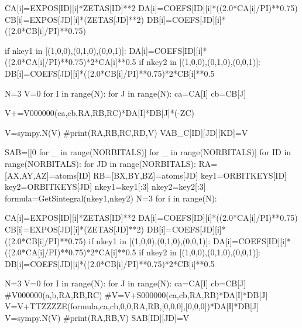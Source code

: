                         CA[i]=EXPOS[ID][i]*ZETAS[ID]**2
                        DA[i]=COEFS[ID][i]*((2.0*CA[i]/PI)**0.75)
                        CB[i]=EXPOS[JD][i]*(ZETAS[JD]**2)
                        DB[i]=COEFS[JD][i]*((2.0*CB[i]/PI)**0.75)

                        if nkey1 in [(1,0,0),(0,1,0),(0,0,1)]:
                            DA[i]=COEFS[ID][i]*((2.0*CA[i]/PI)**0.75)*2*CA[i]**0.5
                        if nkey2 in [(1,0,0),(0,1,0),(0,0,1)]:
                            DB[i]=COEFS[JD][i]*((2.0*CB[i]/PI)**0.75)*2*CB[i]**0.5

                    N=3
                    V=0
                    for I in range(N):            
                        for J in range(N):
                                ca=CA[I]
                                cb=CB[J]
 
                                V+=V000000(ca,cb,RA,RB,RC)*DA[I]*DB[J]*(-ZC)
 
                    V=sympy.N(V)
                    #print(RA,RB,RC,RD,V)
                    VAB_C[ID][JD][KD]=V

    SAB=[[0 for _ in range(NORBITALS)] for _  in range(NORBITALS)]              
    for ID in range(NORBITALS):
        for JD in range(NORBITALS):
            RA=[AX,AY,AZ]=atoms[ID]
            RB=[BX,BY,BZ]=atoms[JD]
            key1=ORBITKEYS[ID]
            key2=ORBITKEYS[JD]
            nkey1=key1[:3]
            nkey2=key2[:3]
            formula=GetSintegral(nkey1,nkey2)
            N=3
            for i in range(N):
 
                CA[i]=EXPOS[ID][i]*ZETAS[ID]**2
                DA[i]=COEFS[ID][i]*((2.0*CA[i]/PI)**0.75)
                CB[i]=EXPOS[JD][i]*(ZETAS[JD]**2)
                DB[i]=COEFS[JD][i]*((2.0*CB[i]/PI)**0.75)
                if nkey1 in [(1,0,0),(0,1,0),(0,0,1)]:
                    DA[i]=COEFS[ID][i]*((2.0*CA[i]/PI)**0.75)*2*CA[i]**0.5
                if nkey2 in [(1,0,0),(0,1,0),(0,0,1)]:
                    DB[i]=COEFS[JD][i]*((2.0*CB[i]/PI)**0.75)*2*CB[i]**0.5

            N=3
            V=0
            for I in range(N):            
                for J in range(N):
                            ca=CA[I]
                            cb=CB[J]
                            #V000000(a,b,RA,RB,RC)
                            #V=V+S000000(ca,cb,RA,RB)*DA[I]*DB[J]
                            V=V+TTZZZZE(formula,ca,cb,0,0,RA,RB,[0,0,0],[0,0,0])*DA[I]*DB[J]
            V=sympy.N(V)
            #print(RA,RB,V)
            SAB[ID][JD]=V

